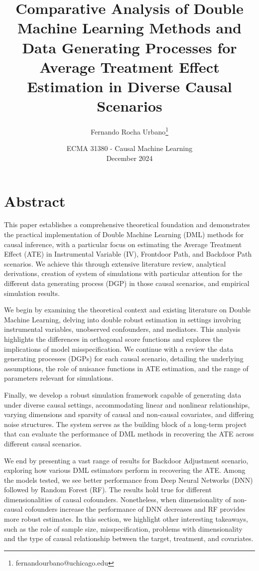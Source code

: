 \documentclass{article}
\title{Comparative Analysis of Double Machine Learning Methods and Data Generating Processes for Average Treatment Effect Estimation in Diverse Causal Scenarios}
\author{Fernando Rocha Urbano\footnote{fernandourbano@uchicago.edu}}
\date{
    ECMA 31380 - Causal Machine Learning \\ \vspace{.5cm} December 2024
}
\numberwithin{equation}{section}
\begin{document}
\begin{titlepage}
    \vfill
    \maketitle
    \vfill
\end{titlepage}

\section{Abstract}

This paper establishes a comprehensive theoretical foundation and demonstrates the practical implementation of Double Machine Learning (DML) methods for causal inference, with a particular focus on estimating the Average Treatment Effect (ATE) in Instrumental Variable (IV), Frontdoor Path, and Backdoor Path scenarios. We achieve this through extensive literature review, analytical derivations, creation of system of simulations with particular attention for the different data generating process (DGP) in those causal scenarios, and empirical simulation results.

We begin by examining the theoretical context and existing literature on Double Machine Learning, delving into double robust estimation in settings involving instrumental variables, unobserved confounders, and mediators. This analysis highlights the differences in orthogonal score functions and explores the implications of model misspecification. We continue with a review the data generating processes (DGPs) for each causal scenario, detailing the underlying assumptions, the role of nuisance functions in ATE estimation, and the range of parameters relevant for simulations.

Finally, we develop a robust simulation framework capable of generating data under diverse causal settings, accommodating linear and nonlinear relationships, varying dimensions and sparsity of causal and non-causal covariates, and differing noise structures. The system serves as the building block of a long-term project that can evaluate the performance of DML methods in recovering the ATE across different causal scenarios.

We end by presenting a vast range of results for Backdoor Adjustment scenario, exploring how various DML estimators perform in recovering the ATE. Among the models tested, we see better performance from Deep Neural Networks (DNN) followed by Random Forest (RF). The results hold true for different dimensionalities of causal cofounders. Nonetheless, when dimensionality of non-causal cofounders increase the performance of DNN decreases and RF provides more robust estimates. In this section, we highlight other interesting takeaways, such as the role of sample size, misspecification, problems with dimensionality and the type of causal relationship between the target, treatment, and covariates.
\end{document}
